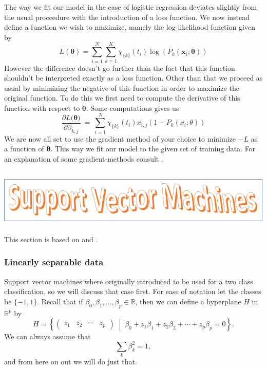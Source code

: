 \documentclass[parskip=half]{scrartcl}
\newcommand{\setof}[2]{\left\{ #1 \; \middle\vert \; #2 \right\}}
\theoremstyle{definition}
\theoremstyle{remark}
\newcommand{\R}{\mathbb{R}}
\begin{document}
The way we fit our model in the case of logistic regression deviates
slightly from the usual proceedure with the introduction of a 
loss function. We now instead define a function we wish to
maximize, namely the log-likelihood function given by 
\begin{equation}
    L(\bm{\theta}) = \sum_{i=1}^N \sum_{k=1}^K 
    \chi_{\{k\}}(t_i) \log( P_k(\bm{x}_i; \bm{\theta}))
\end{equation}
However the difference doesn't go further than the fact that this function
shouldn't be interpreted exactly as a loss function. 
Other than that we proceed as usual by minimizing the negative of this 
function in order to maximize the original function. To do this we
first need to compute the derivative of this function with respect 
to $\bm{\theta}$. Some computations gives us
\begin{equation}
    \frac{\partial L (\bm{\theta)}}{\partial \beta_{k,j}} \ = \
    \sum_{i=1}^N \chi_{\{k\}}(t_i) x_{i,j} (1 - P_k(x_i ; \theta))
\end{equation}
We are now all set to use the gradient method of your choice to minimize
$-L$ as a function of $\bm{\theta}$. This way we fit our model to the given
set of training data. For an explanation of some gradient-methods consult
\cite{proj2}.

\subsection{\protect\includegraphics{svmheading.png}}

This section is based on \cite[Chapter 9]{jwht:intro} and \cite[Chapter 12]{htf:esl}.

\subsubsection{Linearly separable data}

Support vector machines where originally introduced to be used for a two class classification, so we will discuss that case first. 
For ease of notation let the classes be $\{-1,1\}$.
Recall that if $\beta_0, \beta_1, \ldots, \beta_p \in \R$, then we can define a hyperplane $H$ in $\R^p$ by 
\[
	H = \setof{\begin{pmatrix} z_1 & z_2  & \cdots & z_p \end{pmatrix}}{\beta_0 + z_1 \beta_1 + z_2 \beta_2 + \cdots + z_p \beta_p = 0}. 
\]  
We can always assume that  
\[
	\sum_k \beta_k^2 = 1,
\]
and from here on out we will do just that. 
\end{document}
